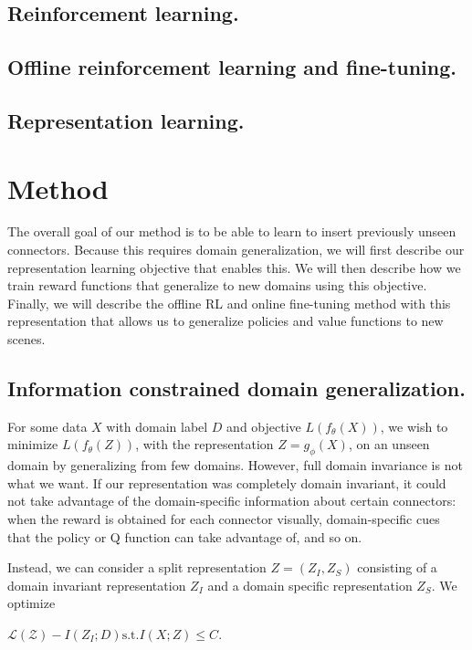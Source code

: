 \documentclass[letterpaper, 10 pt, conference, final]{ieeeconf}   %
\begin{document}
\subsection{Reinforcement learning.}

\subsection{Offline reinforcement learning and fine-tuning.}


\subsection{Representation learning.}

\section{Method}

The overall goal of our method is to be able to learn to insert previously unseen connectors. Because this requires domain generalization, we will first describe our representation learning objective that enables this. We will then describe how we train reward functions that generalize to new domains using this objective. Finally, we will describe the offline RL and online fine-tuning method with this representation that allows us to generalize policies and value functions to new scenes.

\subsection{Information constrained domain generalization.}

For some data $X$ with domain label $D$ and objective $L(f_\theta(X))$, we wish to minimize $L(f_\theta(Z))$, with the representation $Z=g_\phi(X)$, on an unseen domain by generalizing from few domains. However, full domain invariance is not what we want. If our representation was completely domain invariant, it could not take advantage of the domain-specific information about certain connectors: when the reward is obtained for each connector visually, domain-specific cues that the policy or Q function can take advantage of, and so on.

Instead, we can consider a split representation $Z = (Z_I, Z_S)$ consisting of a domain invariant representation $Z_I$ and a domain specific representation $Z_S$. We optimize

$\mathcal{L(Z)} - I(Z_I; D) \text{s.t.} I(X; Z) \leq C$.
\end{document}

